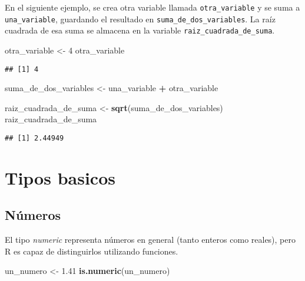 \documentclass[
]{book}
\newenvironment{Shaded}{\begin{snugshade}}{\end{snugshade}}
\newcommand{\DecValTok}[1]{\textcolor[rgb]{0.00,0.00,0.81}{#1}}
\newcommand{\FloatTok}[1]{\textcolor[rgb]{0.00,0.00,0.81}{#1}}
\newcommand{\KeywordTok}[1]{\textcolor[rgb]{0.13,0.29,0.53}{\textbf{#1}}}
\newcommand{\NormalTok}[1]{#1}
\newcommand{\OperatorTok}[1]{\textcolor[rgb]{0.81,0.36,0.00}{\textbf{#1}}}
\newcommand{\StringTok}[1]{\textcolor[rgb]{0.31,0.60,0.02}{#1}}
\begin{document}
En el siguiente ejemplo, se crea otra variable llamada \texttt{otra\_variable} y se suma a \texttt{una\_variable}, guardando el resultado en \texttt{suma\_de\_dos\_variables}. La raíz cuadrada de esa suma se almacena en la variable \texttt{raiz\_cuadrada\_de\_suma}.

\begin{Shaded}
\begin{Highlighting}[]
\NormalTok{otra_variable <-}\StringTok{ }\DecValTok{4}
\NormalTok{otra_variable}
\end{Highlighting}
\end{Shaded}

\begin{verbatim}
## [1] 4
\end{verbatim}

\begin{Shaded}
\begin{Highlighting}[]
\NormalTok{suma_de_dos_variables <-}\StringTok{ }\NormalTok{una_variable }\OperatorTok{+}\StringTok{ }\NormalTok{otra_variable}

\NormalTok{raiz_cuadrada_de_suma <-}\StringTok{ }\KeywordTok{sqrt}\NormalTok{(suma_de_dos_variables)}
\NormalTok{raiz_cuadrada_de_suma}
\end{Highlighting}
\end{Shaded}

\begin{verbatim}
## [1] 2.44949
\end{verbatim}

\hypertarget{tipos-basicos}{%
\section{Tipos basicos}\label{tipos-basicos}}

\hypertarget{nuxfameros}{%
\subsection{Números}\label{nuxfameros}}

El tipo \emph{numeric} representa números en general (tanto enteros como reales), pero R es capaz de distinguirlos utilizando funciones.

\begin{Shaded}
\begin{Highlighting}[]
\NormalTok{un_numero <-}\StringTok{ }\FloatTok{1.41}
\KeywordTok{is.numeric}\NormalTok{(un_numero)}
\end{Highlighting}
\end{Shaded}
\end{document}
